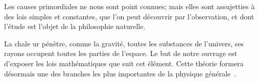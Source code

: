 \documentclass[varvw,largesc,upint,mathalfa=cal=euler,hyphenate,balance,lang-second=french,lang=english,colorlinks]{asmeconf} %
\begin{document}
Les causes primordiales ne nous sont point con­nues; mais elles sont assujetties à des lois simples et constantes, que l'on peut découvrir par l'obser­vation, et dont l'étude est l'objet de la philosophie naturelle. 

La chale ur pénètre, comme la gravité, toutes les substances de l'univers, ses rayons occupent toutes les parties de l'espace. Le but de notre ouvrage est d'exposer les lois mathématiques que suit cet élé­ment. Cette théorie formera désormais une des branches les plus importantes de la physique gé­nérale~\cite{fourier1822}. 

\end{document}
